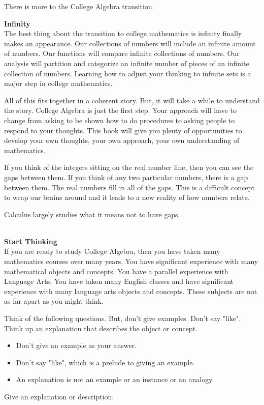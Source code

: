\documentclass{ximera}
\begin{document}
There is more to the College Algebra transition.




\textbf{Infinity} \\ 
The best thing about the transition to college mathematics is infinity finally makes an appearance. Our collections of numbers will include an infinite amount of numbers. Our functions will compare infinite collections of numbers. Our analysis will partition and categorize an infinite number of pieces of an infinite collection of numbers. Learning how to adjust your thinking to infinite sets is a major step in college mathematics.

All of this fits together in a coherent story. But, it will take a while to understand the story.  College Algebra is just the first step. Your approach will have to change from asking to be shown how to do procedures to asking people to respond to your thoughts. This book will give you plenty of opportunities to develop your own thoughts, your own approach, your own understanding of mathematics.




\begin{idea}
If you think of the integers sitting on the real number line, then you can see the gaps between them. If you think of any two particular numbers, there is a gap between them. The real numbers fill in all of the gaps.  This is a difficult concept to wrap our brains around and it leads to a new reality of how numbers relate.

Calculus largely studies what it means not to have gaps.  

\end{idea}









\quad \\

\textbf{Start Thinking} \\ 
If you are ready to study College Algebra, then you have taken many mathematics courses over many years. You have significant experience with many mathematical objects and concepts. You have a parallel experience with Language Arts.  You have taken many English classes and have significant experience with many language arts objects and concepts. These subjects are not as far apart as you might think.

Think of the following questions. But, don't give examples. Don't say "like". Think up an explanation that describes the object or concept.  
\begin{itemize}
\item Don't give an example as your answer.
\item Don't say "like", which is a prelude to giving an example.
\item An explanation is not an example or an instance or an analogy.
\end{itemize}
Give an explanation or description.
\end{document}
